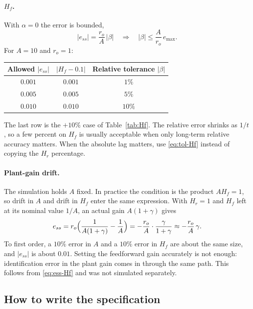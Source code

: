 \documentclass[12pt,a4paper]{article}
\begin{document}
\paragraph{\(H_f\).}
With \(\alpha=0\) the error is bounded,
\begin{equation}
  |e_{ss}|=\frac{r_o}{A}\,|\beta|
  \quad\Rightarrow\quad
  |\beta|\le\frac{A}{r_o}\,e_{\max}.
  \label{eq:tol-Hf}
\end{equation}
For \(A=10\) and \(r_o=1\):
\begin{center}
\begin{tabular}{ccc}
  \toprule
  Allowed \(|e_{ss}|\) & \(|H_f-0.1|\) & Relative tolerance \(|\beta|\) \\
  \midrule
  \(0.001\) & \(0.001\) & \(1\%\) \\
  \(0.005\) & \(0.005\) & \(5\%\) \\
  \(0.010\) & \(0.010\) & \(10\%\) \\
  \bottomrule
\end{tabular}
\end{center}
The last row is the \(+10\%\) case of Table~\ref{tab:Hf}.
The relative error shrinks as \(1/t\), so a few percent on \(H_f\) is usually acceptable when only long-term relative accuracy matters. When the absolute lag matters, use \eqref{eq:tol-Hf} instead of copying the \(H_r\) percentage.

\paragraph{Plant-gain drift.}
The simulation holds \(A\) fixed. In practice the condition is the product \(A H_f=1\), so drift in \(A\) and drift in \(H_f\) enter the same expression.
With \(H_r=1\) and \(H_f\) left at its nominal value \(1/A\), an actual gain \(A(1+\gamma)\) gives
\[
  e_{ss}
  =r_o\Bigl(\frac{1}{A(1+\gamma)}-\frac{1}{A}\Bigr)
  =-\frac{r_o}{A}\cdot\frac{\gamma}{1+\gamma}
  \approx-\frac{r_o}{A}\,\gamma.
\]
To first order, a \(10\%\) error in \(A\) and a \(10\%\) error in \(H_f\) are about the same size, and \(|e_{ss}|\) is about \(0.01\).
Setting the feedforward gain accurately is not enough: identification error in the plant gain comes in through the same path. This follows from \eqref{eq:ess-Hf} and was not simulated separately.

\subsection{How to write the specification}
\end{document}
